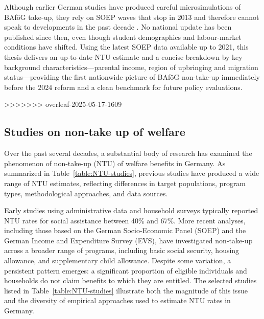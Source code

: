 Although earlier German studies have produced careful microsimulations of BAföG take-up, they rely on SOEP waves that stop in 2013 and therefore cannot speak to developments in the past decade \citep{herber_non-take-up_2019, bruckmeier_new_2012}. No national update has been published since then, even though student demographics and labour-market conditions have shifted. Using the latest SOEP data available up to 2021, this thesis delivers an up-to-date NTU estimate and a concise breakdown by key background characteristics—parental income, region of upbringing and migration status—providing the first nationwide picture of BAföG non-take-up immediately before the 2024 reform and a clean benchmark for future policy evaluations.

>>>>>>> overleaf-2025-05-17-1609

\subsection{Studies on non-take up of welfare}

Over the past several decades, a substantial body of research has examined the phenomenon of non-take-up (NTU) of welfare benefits in Germany. 
As summarized in Table~\ref{table:NTU-studies}, previous studies have produced a wide range of NTU estimates, reflecting differences in target populations, program types, methodological approaches, and data sources. 

Early studies using administrative data and household surveys typically reported NTU rates for social assistance between 40\% and 67\%. 
More recent analyses, including those based on the German Socio-Economic Panel (SOEP) and the German Income and Expenditure Survey (EVS), have investigated non-take-up across a broader range of programs, including basic social security, housing allowance, and supplementary child allowance. 
Despite some variation, a persistent pattern emerges: a significant proportion of eligible individuals and households do not claim benefits to which they are entitled. 
The selected studies listed in Table~\ref{table:NTU-studies} illustrate both the magnitude of this issue and the diversity of empirical approaches used to estimate NTU rates in Germany.

